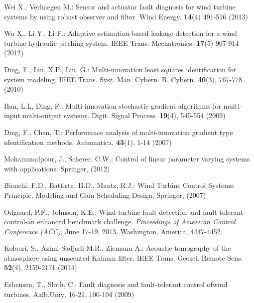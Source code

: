 \documentclass{article}
\begin{document}
\begin{thebibliography}{99}
Wei X., Verhaegen M.: Sensor and actuator fault diagnosis for wind turbine systems by using robust observer and filter. Wind Energy. \textbf{14}(4)  491-516 (2013)


Wu X., Li Y., Li F.: Adaptive estimation-based leakage detection for a wind turbine hydraulic pitching system. IEEE Trans. Mechatronics.  \textbf{17}(5) 907-914 (2012)


Ding, F., Liu, X.P., Liu, G.: Multi-innovation least squares identification for system modeling. IEEE Trans. Syst. Man. Cybern. B. Cybern. \textbf{40}(3), 767-778 (2010)

Han, L.L, Ding, F.: Multi-innovation stochastic gradient algorithms for multi-input multi-output systems. Digit. Signal Process. \textbf{19}(4), 545-554 (2009)

Ding, F., Chen, T.: Performance analysis of multi-innovation gradient type identification methods. Automatica. \textbf{43}(1), 1-14 (2007)

Mohammadpour, J., Scherer, C.W.: Control of linear parameter varying systems with applications. Springer, (2012)

Bianchi, F.D., Battista, H.D., Mantz, R.J.: Wind Turbine Control Systems: Principle, Modeling and Gain Scheduling Design, Springer, (2007)



Odgaard, P.F., Johnson, K.E.: Wind turbine fault detection and fault tolerant control-an enhanced benchmark challenge. \emph{Proceedings of American Control Conference (ACC)}, June 17-19, 2013, Washington, America, 4447-4452.

Kolouri, S., Azimi-Sadjadi M.R., Ziemann A.: Acoustic tomography of the atmosphere using unscented Kalman filter. IEEE Trans. Geosci. Remote Sens. \textbf{52}(4), 2159-2171  (2014)

Esbensen, T., Sloth, C.: Fault diagnosis and fault-tolerant control ofwind turbines. Aalb.Univ. 16-21, 100-104 (2009)




\end{thebibliography}
\end{document}
